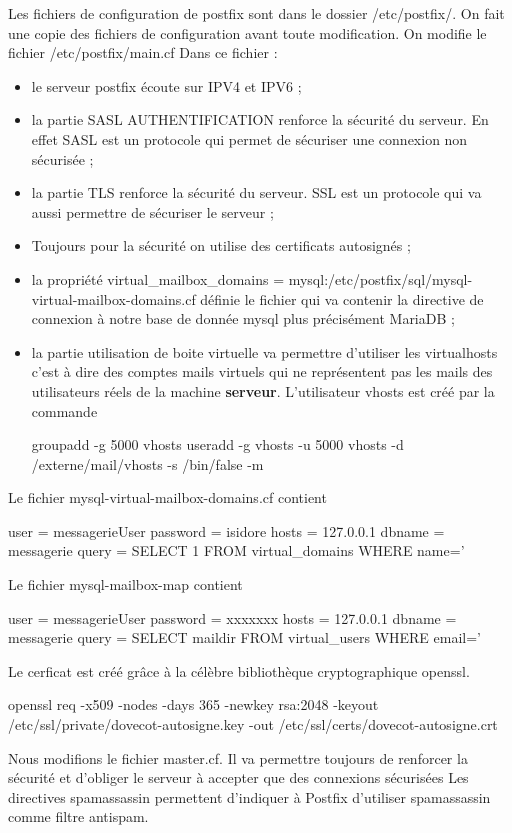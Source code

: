 \documentclass[a4paper,12pt,french]{report} %
\begin{document}
Les fichiers de configuration de postfix sont dans le dossier /etc/postfix/.
On fait une copie des fichiers de configuration avant toute modification.
On modifie le fichier /etc/postfix/main.cf
Dans ce fichier :
\begin{itemize}
	\item le serveur postfix écoute sur IPV4 et IPV6 ;
	\item la partie SASL AUTHENTIFICATION renforce la sécurité du serveur. En effet SASL est un protocole qui permet de sécuriser une connexion non sécurisée ;
	\item la partie TLS renforce la sécurité du serveur. SSL est un protocole qui va aussi permettre de sécuriser le serveur ;
	\item Toujours pour la sécurité on utilise des certificats autosignés ; 
	\item la propriété virtual\_mailbox\_domains = mysql:/etc/postfix/sql/mysql-virtual-mailbox-domains.cf définie le fichier qui va contenir la directive de connexion à notre base de donnée mysql plus précisément MariaDB ;
	\item la partie utilisation de boite virtuelle va permettre d'utiliser les virtualhosts c'est à dire des comptes mails virtuels qui ne représentent pas les mails des utilisateurs réels de la machine \textbf{serveur}. L'utilisateur vhosts est créé par la commande
	\begin{exempleConsole}
	groupadd -g 5000 vhosts 
	useradd -g vhosts -u 5000 vhosts -d /externe/mail/vhosts -s /bin/false -m
	\end{exempleConsole}
\end{itemize}

Le fichier mysql-virtual-mailbox-domains.cf contient 
\begin{exempleConsole}
user = messagerieUser
password = isidore
hosts = 127.0.0.1
dbname = messagerie
query = SELECT 1 FROM virtual_domains WHERE name='%
\end{exempleConsole}
Le fichier mysql-mailbox-map contient 
\begin{exempleConsole}
user = messagerieUser
password = xxxxxxx
hosts = 127.0.0.1
dbname = messagerie
query = SELECT maildir FROM virtual_users WHERE email='%
\end{exempleConsole}
Le cerficat est créé grâce à la célèbre bibliothèque  cryptographique openssl.
\begin{exempleConsole}
openssl req -x509 -nodes -days 365 -newkey rsa:2048 -keyout /etc/ssl/private/dovecot-autosigne.key -out /etc/ssl/certs/dovecot-autosigne.crt
\end{exempleConsole}
Nous modifions le fichier master.cf. Il va permettre toujours de renforcer la sécurité et d'obliger le serveur à accepter que des connexions sécurisées
Les directives spamassassin permettent d'indiquer à Postfix d'utiliser spamassassin comme filtre antispam.
\end{document}
